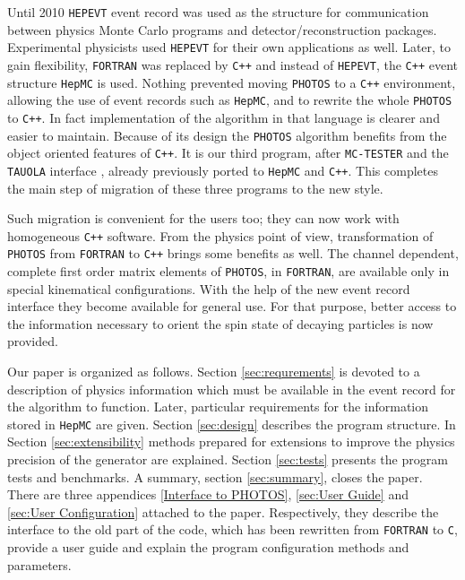 \documentclass[]{Photos_interface_design}
\begin{document}
Until 2010 {\tt HEPEVT} \cite{Altarelli:1989wu} event record was used as the structure for 
communication between physics Monte Carlo programs and detector/reconstruction 
packages. Experimental physicists used {\tt HEPEVT} 
for their own applications  as well. Later, to gain  flexibility, {\tt FORTRAN} was replaced by {\tt C++} and 
instead of {\tt HEPEVT}, the {\tt C++} event structure  {\tt HepMC} \cite{Dobbs:2001ck}
is used. Nothing prevented 
moving {\tt PHOTOS} to a {\tt C++} environment, allowing the use of event records such as {\tt HepMC},
and to rewrite the whole 
{\tt PHOTOS} to {\tt C++}. In fact implementation of the algorithm in that language 
is clearer and easier to
 maintain. Because of its design the {\tt PHOTOS} algorithm benefits from the object 
oriented features of {\tt C++}. It is our third program, after {\tt MC-TESTER} \cite{Davidson:2008ma}
and the {\tt TAUOLA} interface \cite{Davidson:2010rw}, already previously ported to {\tt HepMC} and {\tt C++}.
This completes the main step of migration of these three programs to the new style.

Such migration is convenient for the users too; they can now work
with  homogeneous {\tt C++} software. From the physics point of view, transformation 
of {\tt PHOTOS} 
from {\tt FORTRAN} to {\tt C++}  brings some benefits as well.
The channel dependent, complete first order matrix elements of {\tt PHOTOS}, in {\tt FORTRAN},
 are available only 
in special
kinematical configurations. With the help of the new  event record interface they  become
available for general use.
For that purpose, better access to the information necessary to orient the spin state of decaying particles
is now provided.



Our paper is organized as follows. Section \ref{sec:requrements} is devoted
to a description of physics information which must be available in the event
record for the algorithm to function. Later, particular requirements for the 
information stored in {\tt HepMC} are given. Section \ref{sec:design} describes
the program structure. In Section \ref{sec:extensibility} methods prepared for 
extensions to improve the physics precision of the generator are explained.
Section \ref{sec:tests} presents the program tests and benchmarks. 
A summary, section \ref{sec:summary}, closes the paper.
There are three appendices \ref{Interface to PHOTOS}, 
\ref{sec:User Guide} and \ref{sec:User Configuration} attached to the paper.
Respectively, they describe the interface to the old part of the code, which has been rewritten from {\tt FORTRAN} to {\tt C},
provide a user guide and explain the program configuration methods and parameters. 
\end{document}
